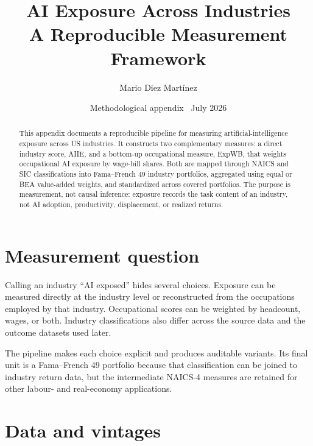 \documentclass[11pt,a4paper]{article}
\title{AI Exposure Across Industries\\
\large A Reproducible Measurement Framework}
\author{Mario Diez Mart\'inez}
\date{Methodological appendix \textperiodcentered\ July 2026}
\begin{document}
\maketitle

\begin{abstract}
This appendix documents a reproducible pipeline for measuring artificial-intelligence exposure across US industries. It constructs two complementary measures: a direct industry score, AIIE, and a bottom-up occupational measure, ExpWB, that weights occupational AI exposure by wage-bill shares. Both are mapped through NAICS and SIC classifications into Fama--French 49 industry portfolios, aggregated using equal or BEA value-added weights, and standardized across covered portfolios. The purpose is measurement, not causal inference: exposure records the task content of an industry, not AI adoption, productivity, displacement, or realized returns.
\end{abstract}

\section{Measurement question}

Calling an industry ``AI exposed'' hides several choices. Exposure can be measured directly at the industry level or reconstructed from the occupations employed by that industry. Occupational scores can be weighted by headcount, wages, or both. Industry classifications also differ across the source data and the outcome datasets used later.

The pipeline makes each choice explicit and produces auditable variants. Its final unit is a Fama--French 49 portfolio because that classification can be joined to industry return data, but the intermediate NAICS-4 measures are retained for other labour- and real-economy applications.

\section{Data and vintages}
\end{document}
